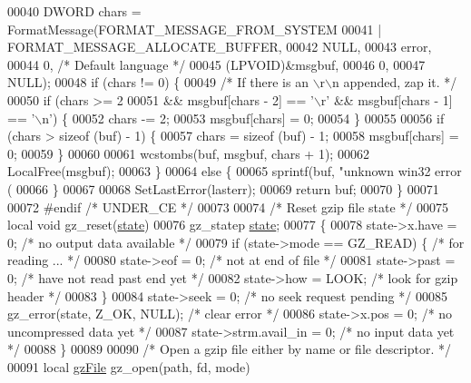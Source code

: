 \begin{DoxyCode}
00040     DWORD chars = FormatMessage(FORMAT\_MESSAGE\_FROM\_SYSTEM
00041         | FORMAT\_MESSAGE\_ALLOCATE\_BUFFER,
00042         NULL,
00043         error,
00044         0, \textcolor{comment}{/* Default language */}
00045         (LPVOID)&msgbuf,
00046         0,
00047         NULL);
00048     \textcolor{keywordflow}{if} (chars != 0) \{
00049         \textcolor{comment}{/* If there is an \(\backslash\)r\(\backslash\)n appended, zap it.  */}
00050         \textcolor{keywordflow}{if} (chars >= 2
00051             && msgbuf[chars - 2] == \textcolor{charliteral}{'\(\backslash\)r'} && msgbuf[chars - 1] == \textcolor{charliteral}{'\(\backslash\)n'}) \{
00052             chars -= 2;
00053             msgbuf[chars] = 0;
00054         \}
00055 
00056         \textcolor{keywordflow}{if} (chars > \textcolor{keyword}{sizeof} (buf) - 1) \{
00057             chars = \textcolor{keyword}{sizeof} (buf) - 1;
00058             msgbuf[chars] = 0;
00059         \}
00060 
00061         wcstombs(buf, msgbuf, chars + 1);
00062         LocalFree(msgbuf);
00063     \}
00064     \textcolor{keywordflow}{else} \{
00065         sprintf(buf, \textcolor{stringliteral}{"unknown win32 error (%
00066     \}
00067 
00068     SetLastError(lasterr);
00069     \textcolor{keywordflow}{return} buf;
00070 \}
00071 
00072 \textcolor{preprocessor}{#endif }\textcolor{comment}{/* UNDER\_CE */}\textcolor{preprocessor}{}
00073 
00074 \textcolor{comment}{/* Reset gzip file state */}
00075 local \textcolor{keywordtype}{void} gz\_reset(\hyperlink{structstate}{state})
00076     gz\_statep \hyperlink{structstate}{state};
00077 \{
00078     state->x.have = 0;              \textcolor{comment}{/* no output data available */}
00079     \textcolor{keywordflow}{if} (state->mode == GZ\_READ) \{   \textcolor{comment}{/* for reading ... */}
00080         state->eof = 0;             \textcolor{comment}{/* not at end of file */}
00081         state->past = 0;            \textcolor{comment}{/* have not read past end yet */}
00082         state->how = LOOK;          \textcolor{comment}{/* look for gzip header */}
00083     \}
00084     state->seek = 0;                \textcolor{comment}{/* no seek request pending */}
00085     gz\_error(state, Z\_OK, NULL);    \textcolor{comment}{/* clear error */}
00086     state->x.pos = 0;               \textcolor{comment}{/* no uncompressed data yet */}
00087     state->strm.avail\_in = 0;       \textcolor{comment}{/* no input data yet */}
00088 \}
00089 
00090 \textcolor{comment}{/* Open a gzip file either by name or file descriptor. */}
00091 local \hyperlink{structgz_file__s}{gzFile} gz\_open(path, fd, mode)
}
\end{DoxyCode}
